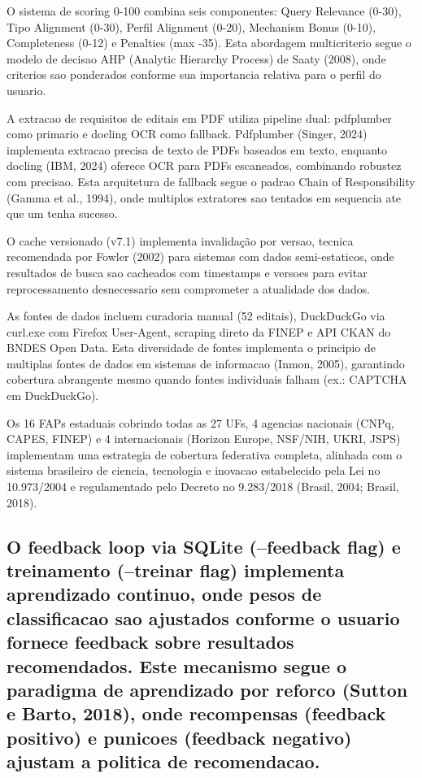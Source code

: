 \documentclass[
  12pt,
]{article}
\begin{document}
O sistema de scoring 0-100 combina seis componentes: Query Relevance
(0-30), Tipo Alignment (0-30), Perfil Alignment (0-20), Mechanism Bonus
(0-10), Completeness (0-12) e Penalties (max -35). Esta abordagem
multicriterio segue o modelo de decisao AHP (Analytic Hierarchy Process)
de Saaty (2008), onde criterios sao ponderados conforme sua importancia
relativa para o perfil do usuario.

A extracao de requisitos de editais em PDF utiliza pipeline dual:
pdfplumber como primario e docling OCR como fallback. Pdfplumber
(Singer, 2024) implementa extracao precisa de texto de PDFs baseados em
texto, enquanto docling (IBM, 2024) oferece OCR para PDFs escaneados,
combinando robustez com precisao. Esta arquitetura de fallback segue o
padrao Chain of Responsibility (Gamma et al., 1994), onde multiplos
extratores sao tentados em sequencia ate que um tenha sucesso.

O cache versionado (v7.1) implementa invalidação por versao, tecnica
recomendada por Fowler (2002) para sistemas com dados semi-estaticos,
onde resultados de busca sao cacheados com timestamps e versoes para
evitar reprocessamento desnecessario sem comprometer a atualidade dos
dados.

As fontes de dados incluem curadoria manual (52 editais), DuckDuckGo via
curl.exe com Firefox User-Agent, scraping direto da FINEP e API CKAN do
BNDES Open Data. Esta diversidade de fontes implementa o principio de
multiplas fontes de dados em sistemas de informacao (Inmon, 2005),
garantindo cobertura abrangente mesmo quando fontes individuais falham
(ex.: CAPTCHA em DuckDuckGo).

Os 16 FAPs estaduais cobrindo todas as 27 UFs, 4 agencias nacionais
(CNPq, CAPES, FINEP) e 4 internacionais (Horizon Europe, NSF/NIH, UKRI,
JSPS) implementam uma estrategia de cobertura federativa completa,
alinhada com o sistema brasileiro de ciencia, tecnologia e inovacao
estabelecido pela Lei no 10.973/2004 e regulamentado pelo Decreto no
9.283/2018 (Brasil, 2004; Brasil, 2018).

\subsection{O feedback loop via SQLite (--feedback flag) e treinamento
(--treinar flag) implementa aprendizado continuo, onde pesos de
classificacao sao ajustados conforme o usuario fornece feedback sobre
resultados recomendados. Este mecanismo segue o paradigma de aprendizado
por reforco (Sutton e Barto, 2018), onde recompensas (feedback positivo)
e punicoes (feedback negativo) ajustam a politica de
recomendacao.}\label{o-feedback-loop-via-sqlite-feedback-flag-e-treinamento-treinar-flag-implementa-aprendizado-continuo-onde-pesos-de-classificacao-sao-ajustados-conforme-o-usuario-fornece-feedback-sobre-resultados-recomendados.-este-mecanismo-segue-o-paradigma-de-aprendizado-por-reforco-sutton-e-barto-2018-onde-recompensas-feedback-positivo-e-punicoes-feedback-negativo-ajustam-a-politica-de-recomendacao.}
\end{document}
